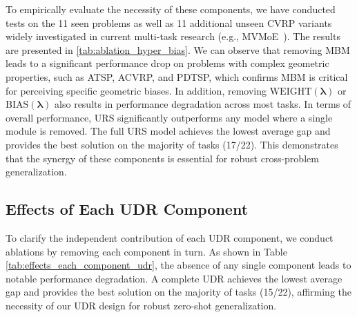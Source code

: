 \documentclass{article}
\theoremstyle{plain}
\theoremstyle{definition}
\theoremstyle{remark}
\begin{document}
To empirically evaluate the necessity of these components, we have conducted tests on the 11 seen problems as well as 11 additional unseen CVRP variants widely investigated in current multi-task research (e.g., MVMoE~\citep{zhou2024mvmoe}). The results are presented in \cref{tab:ablation_hyper_bias}. We can observe that removing MBM leads to a significant performance drop on problems with complex geometric properties, such as ATSP, ACVRP, and PDTSP, which confirms MBM is critical for perceiving specific geometric biases. In addition, removing $\mathrm{WEIGHT}(\bm{\lambda})$ or $\mathrm{BIAS}(\bm{\lambda})$ also results in performance degradation across most tasks. In terms of overall performance, URS significantly outperforms any model where a single module is removed. The full URS model achieves the lowest average gap and provides the best solution on the majority of tasks (17/22). This demonstrates that the synergy of these components is essential for robust cross-problem generalization.

\subsection{Effects of Each UDR Component}
\label{append:effect_udr_component}
To clarify the independent contribution of each UDR component, we conduct ablations by removing each component in turn. As shown in Table \ref{tab:effects_each_component_udr}, the absence of any single component leads to notable performance degradation. A complete UDR achieves the lowest average gap and provides the best solution on the majority of tasks (15/22), affirming the necessity of our UDR design for robust zero-shot generalization.
\end{document}
